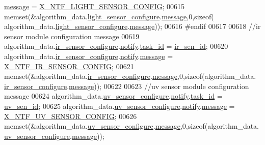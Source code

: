\begin{DoxyCode}
{{{{{      \hyperlink{a00036_adf9665938515a20c283eea2c978cf80d}{message}     = \hyperlink{a00018_ac8c3accc8173c965137b300542e451e6}{X\_NTF\_LIGHT\_SENSOR\_CONFIG};
00615     memset(&algorithm\_data.\hyperlink{a00016_a8fc7528336e37724802eb52753c7b7a6}{light\_sensor\_configure}.\hyperlink{a00018_a32952acc732e2f16aad59fe0804da5bf}{message},0,\textcolor{keyword}{sizeof}(
      algorithm\_data.\hyperlink{a00016_a8fc7528336e37724802eb52753c7b7a6}{light\_sensor\_configure}.\hyperlink{a00018_a32952acc732e2f16aad59fe0804da5bf}{message}));
00616 \textcolor{preprocessor}{#endif}
00617 
00618     \textcolor{comment}{//ir sensor module configuration message}
00619     algorithm\_data.\hyperlink{a00016_ac6483a3473f539f671660ae458d889d3}{ir\_sensor\_configure}.\hyperlink{a00018_a8e6a04c2283f9fd7b8dcbc62faba5847}{notify}.\hyperlink{a00036_a21b41e494a28583d4da10f1afb1c5328}{task\_id}        = 
      \hyperlink{a00017_a624782f67b3870f0dde83528770ef5fc}{ir\_sen\_id};
00620     algorithm\_data.\hyperlink{a00016_ac6483a3473f539f671660ae458d889d3}{ir\_sensor\_configure}.\hyperlink{a00018_a8e6a04c2283f9fd7b8dcbc62faba5847}{notify}.\hyperlink{a00036_adf9665938515a20c283eea2c978cf80d}{message}        = 
      \hyperlink{a00017_abb12b7d6a5f3479f552b928bb008d7cd}{X\_NTF\_IR\_SENSOR\_CONFIG};
00621     memset(&algorithm\_data.\hyperlink{a00016_ac6483a3473f539f671660ae458d889d3}{ir\_sensor\_configure}.\hyperlink{a00018_a32952acc732e2f16aad59fe0804da5bf}{message},0,\textcolor{keyword}{sizeof}(algorithm\_data.
      \hyperlink{a00016_ac6483a3473f539f671660ae458d889d3}{ir\_sensor\_configure}.\hyperlink{a00018_a32952acc732e2f16aad59fe0804da5bf}{message}));
00622 
00623      \textcolor{comment}{//uv sensor module configuration message}
00624     algorithm\_data.\hyperlink{a00016_af1ff980a38b896c99e86279a3c67f00d}{uv\_sensor\_configure}.\hyperlink{a00018_a8e6a04c2283f9fd7b8dcbc62faba5847}{notify}.\hyperlink{a00036_a21b41e494a28583d4da10f1afb1c5328}{task\_id}        = 
      \hyperlink{a00020_afd789f3f9ea182d28d4f16db0d8d5652}{uv\_sen\_id};
00625     algorithm\_data.\hyperlink{a00016_af1ff980a38b896c99e86279a3c67f00d}{uv\_sensor\_configure}.\hyperlink{a00018_a8e6a04c2283f9fd7b8dcbc62faba5847}{notify}.\hyperlink{a00036_adf9665938515a20c283eea2c978cf80d}{message}        = 
      \hyperlink{a00020_a08b676499fdf9649e575ed49e9197e13}{X\_NTF\_UV\_SENSOR\_CONFIG};
00626     memset(&algorithm\_data.\hyperlink{a00016_af1ff980a38b896c99e86279a3c67f00d}{uv\_sensor\_configure}.\hyperlink{a00018_a32952acc732e2f16aad59fe0804da5bf}{message},0,\textcolor{keyword}{sizeof}(algorithm\_data.
      \hyperlink{a00016_af1ff980a38b896c99e86279a3c67f00d}{uv\_sensor\_configure}.\hyperlink{a00018_a32952acc732e2f16aad59fe0804da5bf}{message}));
}}}}}
\end{DoxyCode}
